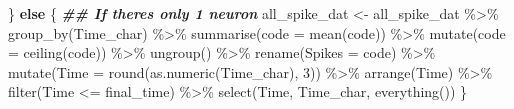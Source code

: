 \documentclass[
]{book}
\newenvironment{Shaded}{\begin{snugshade}}{\end{snugshade}}
\newcommand{\AttributeTok}[1]{\textcolor[rgb]{0.77,0.63,0.00}{#1}}
\newcommand{\ControlFlowTok}[1]{\textcolor[rgb]{0.13,0.29,0.53}{\textbf{#1}}}
\newcommand{\DecValTok}[1]{\textcolor[rgb]{0.00,0.00,0.81}{#1}}
\newcommand{\DocumentationTok}[1]{\textcolor[rgb]{0.56,0.35,0.01}{\textbf{\textit{#1}}}}
\newcommand{\FunctionTok}[1]{\textcolor[rgb]{0.00,0.00,0.00}{#1}}
\newcommand{\NormalTok}[1]{#1}
\newcommand{\OtherTok}[1]{\textcolor[rgb]{0.56,0.35,0.01}{#1}}
\newcommand{\SpecialCharTok}[1]{\textcolor[rgb]{0.00,0.00,0.00}{#1}}
\begin{document}
\begin{Shaded}
\begin{Highlighting}[]
\NormalTok{  \} }\ControlFlowTok{else}\NormalTok{ \{ }\DocumentationTok{\#\# If there\textquotesingle{}s only 1 neuron}
\NormalTok{    all\_spike\_dat }\OtherTok{\textless{}{-}}
\NormalTok{      all\_spike\_dat }\SpecialCharTok{\%\textgreater{}\%}
      \FunctionTok{group\_by}\NormalTok{(Time\_char) }\SpecialCharTok{\%\textgreater{}\%}
      \FunctionTok{summarise}\NormalTok{(}\AttributeTok{code =} \FunctionTok{mean}\NormalTok{(code)) }\SpecialCharTok{\%\textgreater{}\%}
      \FunctionTok{mutate}\NormalTok{(}\AttributeTok{code =} \FunctionTok{ceiling}\NormalTok{(code)) }\SpecialCharTok{\%\textgreater{}\%}
      \FunctionTok{ungroup}\NormalTok{() }\SpecialCharTok{\%\textgreater{}\%}
      \FunctionTok{rename}\NormalTok{(}\AttributeTok{Spikes =}\NormalTok{ code) }\SpecialCharTok{\%\textgreater{}\%}
      \FunctionTok{mutate}\NormalTok{(}\AttributeTok{Time =} \FunctionTok{round}\NormalTok{(}\FunctionTok{as.numeric}\NormalTok{(Time\_char), }\DecValTok{3}\NormalTok{)) }\SpecialCharTok{\%\textgreater{}\%}
      \FunctionTok{arrange}\NormalTok{(Time) }\SpecialCharTok{\%\textgreater{}\%}
      \FunctionTok{filter}\NormalTok{(Time }\SpecialCharTok{\textless{}=}\NormalTok{ final\_time) }\SpecialCharTok{\%\textgreater{}\%}
      \FunctionTok{select}\NormalTok{(Time, Time\_char, }\FunctionTok{everything}\NormalTok{())}
\NormalTok{  \}}


\end{Highlighting}
\end{Shaded}
\end{document}
